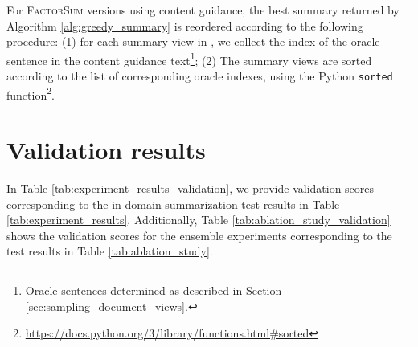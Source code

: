 \documentclass[11pt,table]{article}
\newcommand{\modelname}{FactorSum}
\begin{document}
For \textsc{\modelname} versions using content guidance, the best summary  returned by Algorithm \ref{alg:greedy_summary} is reordered according to the following procedure: (1) for each summary view in , we collect the index of the oracle sentence in the content guidance text\footnote{Oracle sentences determined as described in Section \ref{sec:sampling_document_views}.}; (2) The summary views are sorted according to the list of corresponding oracle indexes, using the Python \texttt{sorted} function\footnote{\url{https://docs.python.org/3/library/functions.html\#sorted}}.

\section{Validation results}
\label{sec:validation_results}

In Table \ref{tab:experiment_results_validation}, we provide validation scores corresponding to the in-domain summarization test results in Table \ref{tab:experiment_results}. Additionally, Table \ref{tab:ablation_study_validation} shows the validation scores for the ensemble experiments corresponding to the test results in Table \ref{tab:ablation_study}. 
\end{document}
